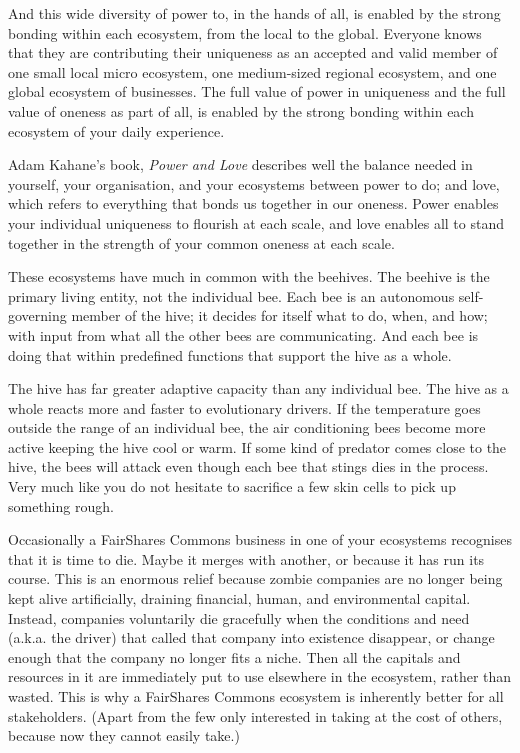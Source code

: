 And this wide diversity of power to, in the hands of all, is enabled by the strong bonding within each ecosystem, from the local to the global. Everyone knows that they are contributing their uniqueness as an accepted and valid member of one small local micro ecosystem, one medium-sized regional ecosystem, and one global ecosystem of businesses. The full value of power in uniqueness and the full value of oneness as part
of all, is enabled by the strong bonding within each ecosystem of your daily experience.


Adam Kahane's  book, \emph{Power and Love}\cite{kahane-power-and-love} describes well the balance needed in yourself, your organisation, and your ecosystems between power to do; and love, which refers to everything that bonds us together in our oneness. Power enables your individual uniqueness to flourish at each scale, and love enables all to stand together in the strength of your common oneness at each scale.


These ecosystems have much in common with the beehives. The beehive is the primary living entity, not the individual bee. Each bee is an autonomous self-governing member of the hive; it decides for itself what to do, when, and how; with input from what all the other bees are communicating. And each bee is doing that within predefined functions that support the hive as a whole.


The hive has far greater adaptive capacity than any individual bee. The hive as a whole reacts more and faster to evolutionary drivers. If the temperature goes outside the range of an individual bee, the air conditioning bees become more active keeping the hive cool or warm. If some kind of predator comes close to the hive, the bees will attack even though each bee that stings dies in the process. Very much like you do not hesitate to sacrifice a few skin cells to pick up something rough.


Occasionally a FairShares Commons  business in one of your ecosystems recognises that it is time to die. Maybe it merges with another, or because it has run its course. This is an enormous relief because zombie companies  are no longer being kept alive artificially, draining financial, human, and environmental capital. Instead, companies voluntarily die gracefully when the conditions and need (a.k.a. the driver) that called that company into existence disappear, or change enough that the company no longer fits a niche. Then all the capitals and resources in it are immediately put to use elsewhere in the ecosystem, rather than wasted. This is why a FairShares Commons ecosystem is inherently better for all stakeholders. (Apart from the few only interested in taking at the cost of others, because now they cannot easily take.) 


